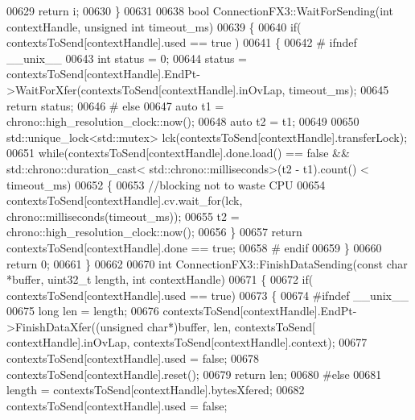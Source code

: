 \begin{DoxyCode}
{{{{00629     \textcolor{keywordflow}{return} i;
00630 \}
00631 
00638 \textcolor{keywordtype}{bool} ConnectionFX3::WaitForSending(\textcolor{keywordtype}{int} contextHandle, \textcolor{keywordtype}{unsigned} \textcolor{keywordtype}{int} timeout_ms)
00639 \{
00640     \textcolor{keywordflow}{if}( contextsToSend[contextHandle].used == \textcolor{keyword}{true} )
00641     \{
00642 \textcolor{preprocessor}{#   ifndef \_\_unix\_\_}
00643     \textcolor{keywordtype}{int} status = 0;
00644     status = contextsToSend[contextHandle].EndPt->WaitForXfer(contextsToSend[contextHandle].inOvLap, 
      timeout\_ms);
00645     \textcolor{keywordflow}{return} status;
00646 \textcolor{preprocessor}{#   else}
00647     \textcolor{keyword}{auto} t1 = chrono::high\_resolution\_clock::now();
00648     \textcolor{keyword}{auto} t2 = t1;
00649 
00650     std::unique\_lock<std::mutex> lck(contextsToSend[contextHandle].transferLock);
00651     \textcolor{keywordflow}{while}(contextsToSend[contextHandle].done.load() == \textcolor{keyword}{false} && std::chrono::duration\_cast<
      std::chrono::milliseconds>(t2 - t1).count() < timeout_ms)
00652     \{
00653         \textcolor{comment}{//blocking not to waste CPU}
00654         contextsToSend[contextHandle].cv.wait\_for(lck, chrono::milliseconds(timeout\_ms));
00655         t2 = chrono::high\_resolution\_clock::now();
00656     \}
00657     \textcolor{keywordflow}{return} contextsToSend[contextHandle].done == \textcolor{keyword}{true};
00658 \textcolor{preprocessor}{#   endif}
00659     \}
00660     \textcolor{keywordflow}{return} 0;
00661 \}
00662 
00670 \textcolor{keywordtype}{int} ConnectionFX3::FinishDataSending(\textcolor{keyword}{const} \textcolor{keywordtype}{char} *buffer, uint32\_t length, \textcolor{keywordtype}{int} contextHandle)
00671 \{
00672     \textcolor{keywordflow}{if}( contextsToSend[contextHandle].used == \textcolor{keyword}{true})
00673     \{
00674 \textcolor{preprocessor}{#ifndef \_\_unix\_\_}
00675         \textcolor{keywordtype}{long} len = length;
00676         contextsToSend[contextHandle].EndPt->FinishDataXfer((\textcolor{keywordtype}{unsigned} \textcolor{keywordtype}{char}*)buffer, len, contextsToSend[
      contextHandle].inOvLap, contextsToSend[contextHandle].context);
00677         contextsToSend[contextHandle].used = \textcolor{keyword}{false};
00678         contextsToSend[contextHandle].reset();
00679         \textcolor{keywordflow}{return} len;
00680 \textcolor{preprocessor}{#else}
00681     length = contextsToSend[contextHandle].bytesXfered;
00682     contextsToSend[contextHandle].used = \textcolor{keyword}{false};
}}}}
\end{DoxyCode}
